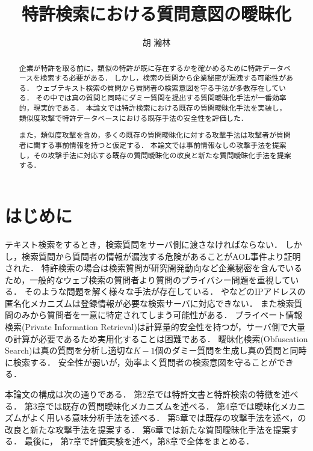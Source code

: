 \documentclass[master]{suribt}
\title{特許検索における質問意図の曖昧化}
\author{胡 瀚林}
\theoremstyle{definition}
\begin{document}
\maketitle%

\frontmatter%
\begin{abstract}%
 企業が特許を取る前に，類似の特許が既に存在するかを確かめるために特許データベースを検索する必要がある．
 しかし，検索の質問から企業秘密が漏洩する可能性がある．
 ウェブテキスト検索の質問から質問者の検索意図を守る手法が多数存在している．
 その中では真の質問と同時にダミー質問を提出する質問曖昧化手法が一番効率的，現実的である．
 本論文では特許検索における既存の質問曖昧化手法を実装し，
 類似度攻撃で特許データベースにおける既存手法の安全性を評価した．

 また，類似度攻撃を含め，多くの既存の質問曖昧化に対する攻撃手法は攻撃者が質問者に関する事前情報を持つと仮定する．
 本論文では事前情報なしの攻撃手法を提案し，その攻撃手法に対応する既存の質問曖昧化の改良と新たな質問曖昧化手法を提案する．
\end{abstract}

 \tableofcontents%

 \mainmatter%
 \chapter{はじめに}

 テキスト検索をするとき，検索質問をサーバ側に渡さなければならない．
 しかし，検索質問から質問者の情報が漏洩する危険があることがAOL事件\cite{AOL}より証明された．
 特許検索の場合は検索質問が研究開発動向など企業秘密を含んでいるため，一般的なウェブ検索の質問者より質問のプライバシー問題を重視している．
 そのような問題を解く様々な手法が存在している．
 \cite{tor2004}や\cite{private2007}などのIPアドレスの匿名化メカニズムは登録情報が必要な検索サーバに対応できない．
 また検索質問のみから質問者を一意に特定されてしまう可能性がある．
 プライベート情報検索(Private Information Retrieval)\cite{pir1998}は計算量的安全性を持つが，サーバ側で大量の計算が必要であるため実用化することは困難である．
 曖昧化検索(Obfuscation Search)\cite{obs2012}は真の質問を分析し適切な$K−1$個のダミー質問を生成し真の質問と同時に検索する．
 安全性が弱いが，効率よく質問者の検索意図を守ることができる．
 

 本論文の構成は次の通りである．
 第2章では特許文書と特許検索の特徴を述べる．
 第3章では既存の質問曖昧化メカニズム\cite{providing2009,embellishing2010,masking2014}を述べる．
 第4章では曖昧化メカニズムがよく用いる意味分析手法を述べる．
 第5章では既存の攻撃手法\cite{simattack2016}を述べ，\cite{simattack2016}の改良と新たな攻撃手法を提案する．
 第6章では新たな質問曖昧化手法を提案する．
 最後に， 第7章で評価実験を述べ，第8章で全体をまとめる．
\end{document}
